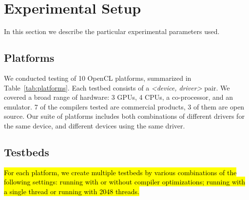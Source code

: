 \section{Experimental Setup}

In this section we describe the particular experimental parameters used.

\subsection{Platforms}

\begin{table*}[t!]
  \scriptsize %
  \centering %
  
  \caption{%
    OpenCL platforms, the time spent in automated testing, and the number of bug reports submitted to date. %
  }
  \label{tab:platforms}
\end{table*}

We conducted testing of 10 OpenCL platforms, summarized in Table~\ref{tab:platforms}. Each testbed consists of a \emph{<device, driver>} pair. We covered a broad range of hardware: 3 GPUs, 4 CPUs, a co-processor, and an emulator. 7 of the compilers tested are commercial products, 3 of them are open source. Our suite of platforms includes both combinations of different drivers for the same device, and different devices using the same driver.

\subsection{Testbeds}
\hl{For each platform, we create multiple testbeds by various combinations of the following settings: running with or without compiler optimizations; running with a single thread or running with 2048 threads.}
